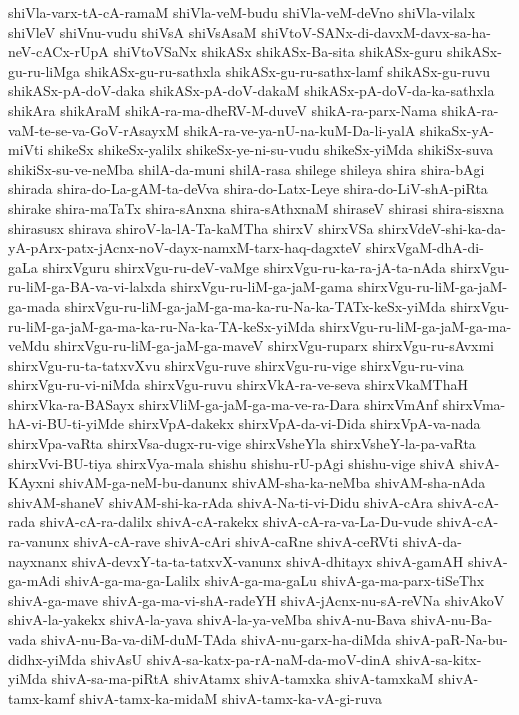 {shiVla-varx-tA-cA-ramaM
shiVla-veM-budu
shiVla-veM-deVno
shiVla-vilalx
shiVleV
shiVnu-vudu
shiVsA
shiVsAsaM
shiVtoV-SANx-di-davxM-davx-sa-ha-neV-cACx-rUpA
shiVtoVSaNx
shikASx
shikASx-Ba-sita
shikASx-guru
shikASx-gu-ru-liMga
shikASx-gu-ru-sathxla
shikASx-gu-ru-sathx-lamf
shikASx-gu-ruvu
shikASx-pA-doV-daka
shikASx-pA-doV-dakaM
shikASx-pA-doV-da-ka-sathxla
shikAra
shikAraM
shikA-ra-ma-dheRV-M-duveV
shikA-ra-parx-Nama
shikA-ra-vaM-te-se-va-GoV-rAsayxM
shikA-ra-ve-ya-nU-na-kuM-Da-li-yalA
shikaSx-yA-miVti
shikeSx
shikeSx-yalilx
shikeSx-ye-ni-su-vudu
shikeSx-yiMda
shikiSx-suva
shikiSx-su-ve-neMba
shilA-da-muni
shilA-rasa
shilege
shileya
shira
shira-bAgi
shirada
shira-do-La-gAM-ta-deVva
shira-do-Latx-Leye
shira-do-LiV-shA-piRta
shirake
shira-maTaTx
shira-sAnxna
shira-sAthxnaM
shiraseV
shirasi
shira-sisxna
shirasusx
shirava
shiroV-la-lA-Ta-kaMTha
shirxV
shirxVSa
shirxVdeV-shi-ka-da-yA-pArx-patx-jAcnx-noV-dayx-namxM-tarx-haq-dagxteV
shirxVgaM-dhA-di-gaLa
shirxVguru
shirxVgu-ru-deV-vaMge
shirxVgu-ru-ka-ra-jA-ta-nAda
shirxVgu-ru-liM-ga-BA-va-vi-lalxda
shirxVgu-ru-liM-ga-jaM-gama
shirxVgu-ru-liM-ga-jaM-ga-mada
shirxVgu-ru-liM-ga-jaM-ga-ma-ka-ru-Na-ka-TATx-keSx-yiMda
shirxVgu-ru-liM-ga-jaM-ga-ma-ka-ru-Na-ka-TA-keSx-yiMda
shirxVgu-ru-liM-ga-jaM-ga-ma-veMdu
shirxVgu-ru-liM-ga-jaM-ga-maveV
shirxVgu-ruparx
shirxVgu-ru-sAvxmi
shirxVgu-ru-ta-tatxvXvu
shirxVgu-ruve
shirxVgu-ru-vige
shirxVgu-ru-vina
shirxVgu-ru-vi-niMda
shirxVgu-ruvu
shirxVkA-ra-ve-seva
shirxVkaMThaH
shirxVka-ra-BASayx
shirxVliM-ga-jaM-ga-ma-ve-ra-Dara
shirxVmAnf
shirxVma-hA-vi-BU-ti-yiMde
shirxVpA-dakekx
shirxVpA-da-vi-Dida
shirxVpA-va-nada
shirxVpa-vaRta
shirxVsa-dugx-ru-vige
shirxVsheYla
shirxVsheY-la-pa-vaRta
shirxVvi-BU-tiya
shirxVya-mala
shishu
shishu-rU-pAgi
shishu-vige
shivA
shivA-KAyxni
shivAM-ga-neM-bu-danunx
shivAM-sha-ka-neMba
shivAM-sha-nAda
shivAM-shaneV
shivAM-shi-ka-rAda
shivA-Na-ti-vi-Didu
shivA-cAra
shivA-cA-rada
shivA-cA-ra-dalilx
shivA-cA-rakekx
shivA-cA-ra-va-La-Du-vude
shivA-cA-ra-vanunx
shivA-cA-rave
shivA-cAri
shivA-caRne
shivA-ceRVti
shivA-da-nayxnanx
shivA-devxY-ta-ta-tatxvX-vanunx
shivA-dhitayx
shivA-gamAH
shivA-ga-mAdi
shivA-ga-ma-ga-Lalilx
shivA-ga-ma-gaLu
shivA-ga-ma-parx-tiSeThx
shivA-ga-mave
shivA-ga-ma-vi-shA-radeYH
shivA-jAcnx-nu-sA-reVNa
shivAkoV
shivA-la-yakekx
shivA-la-yava
shivA-la-ya-veMba
shivA-nu-Bava
shivA-nu-Ba-vada
shivA-nu-Ba-va-diM-duM-TAda
shivA-nu-garx-ha-diMda
shivA-paR-Na-bu-didhx-yiMda
shivAsU
shivA-sa-katx-pa-rA-naM-da-moV-dinA
shivA-sa-kitx-yiMda
shivA-sa-ma-piRtA
shivAtamx
shivA-tamxka
shivA-tamxkaM
shivA-tamx-kamf
shivA-tamx-ka-midaM
shivA-tamx-ka-vA-gi-ruva
}
